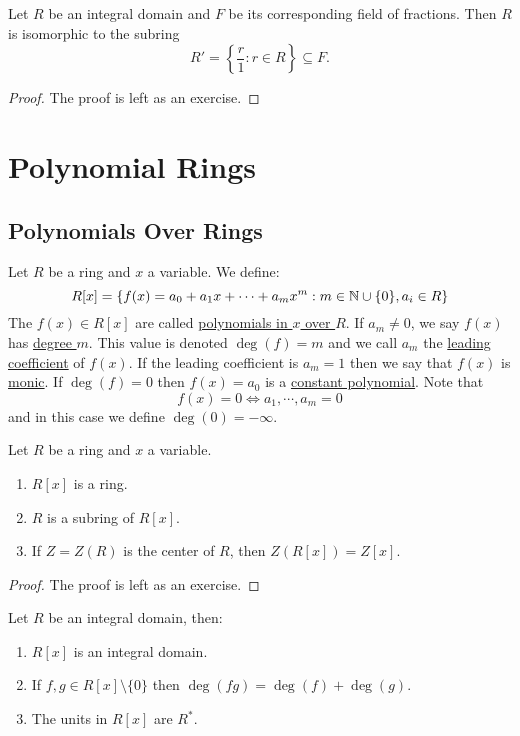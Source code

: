 \documentclass[11pt]{article}
\begin{document}
\begin{proposition}
    Let $R$ be an integral domain and $F$ be its corresponding field of fractions. Then $R$ is isomorphic to the subring
    \[R'=\left\{\frac{r}{1}:r\in R\right\}\subseteq F.\]
\end{proposition}

\begin{proof}
    The proof is left as an exercise.
\end{proof}

\section{Polynomial Rings}

\subsection{Polynomials Over Rings}

\begin{definition}[Polynomials]
    Let $R$ be a ring and $x$ a variable. We define:
    \[R[x]=\{f(x)=a_0+a_1x+\cdots+a_mx^m:m\in\mathbb{N}\cup\{0\},a_i\in R\}\]
    The $f(x)\in R[x]$ are called \ul{polynomials in $x$ over $R$}. If $a_m\neq0$, we say $f(x)$ has \ul{degree $m$}. This value is denoted $\deg(f)=m$ and we call $a_m$ the \ul{leading coefficient} of $f(x)$. If the leading coefficient is $a_m=1$ then we say that $f(x)$ is \ul{monic}. If $\deg(f)=0$ then $f(x)=a_0$ is a \ul{constant polynomial}. Note that
    \[f(x)=0\iff a_1,\cdots,a_m=0\]
    and in this case we define $\deg(0)=-\infty$.
\end{definition}

\begin{proposition}
    Let $R$ be a ring and $x$ a variable.
    \begin{enumerate}
        \item $R[x]$ is a ring.
        \item $R$ is a subring of $R[x]$.
        \item If $Z=Z(R)$ is the center of $R$, then $Z(R[x])=Z[x]$.
    \end{enumerate}
\end{proposition}

\begin{proof}
    The proof is left as an exercise.
\end{proof}

\begin{proposition}
    Let $R$ be an integral domain, then:
    \begin{enumerate}
        \item $R[x]$ is an integral domain.
        \item If $f,g\in R[x]\setminus\{0\}$ then $\deg(fg)=\deg(f)+\deg(g)$.
        \item The units in $R[x]$ are $R^*$.
    \end{enumerate}
\end{proposition}
\end{document}
